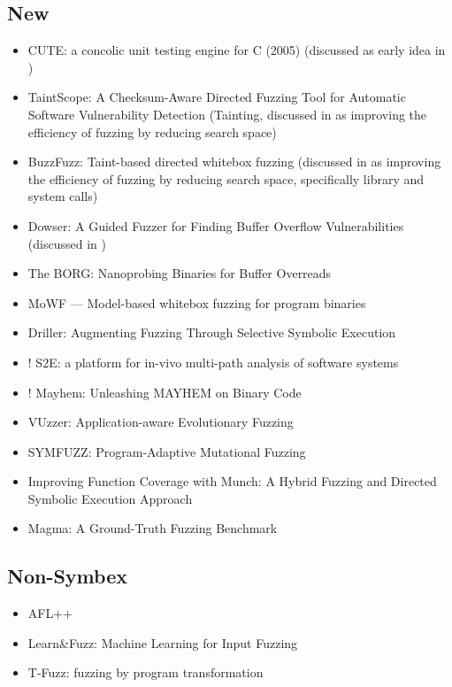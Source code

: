 \documentclass{article}
\begin{document}
\subsection{New}
\begin{itemize}
    \item CUTE: a concolic unit testing engine for C (2005)\cite{CUTE} (discussed as early idea in \cite{Science})
    \item TaintScope: A Checksum-Aware Directed Fuzzing Tool for Automatic Software Vulnerability Detection\cite{TaintScope} (Tainting, discussed in \cite{Science} as improving the efficiency of fuzzing by reducing search space)
    \item BuzzFuzz: Taint-based directed whitebox fuzzing\cite{BuzzFuzz} (discussed in \cite{Science} as improving the efficiency of fuzzing by reducing search space, specifically library and system calls)
    \item Dowser: A Guided Fuzzer for Finding Buffer Overflow Vulnerabilities\cite{Dowser,DowserArticle} (discussed in \cite{Science})
    \item The BORG: Nanoprobing Binaries for Buffer Overreads\cite{BORG}
    \item MoWF — Model-based whitebox fuzzing for program binaries\cite{MoWF}
    \item Driller: Augmenting Fuzzing Through Selective Symbolic Execution\cite{Driller}
    \item ! S2E: a platform for in-vivo multi-path analysis of software systems\cite{S2E}
    \item ! Mayhem: Unleashing MAYHEM on Binary Code\cite{Mayhem}
    \item VUzzer: Application-aware Evolutionary Fuzzing\cite{VUzzer}
    \item SYMFUZZ: Program-Adaptive Mutational Fuzzing\cite{SYMFUZZ}
    \item Improving Function Coverage with Munch: A Hybrid Fuzzing and Directed Symbolic Execution Approach\cite{Munch}
    \item Magma: A Ground-Truth Fuzzing Benchmark\cite{Magma}
\end{itemize}

\subsection{Non-Symbex}
\begin{itemize}
    \item AFL++\cite{AFLPlusPlus}
    \item Learn\&Fuzz: Machine Learning for Input Fuzzing\cite{LearnFuzz}
    \item T-Fuzz: fuzzing by program transformation\cite{TFuzz}
\end{itemize}



\end{document}
